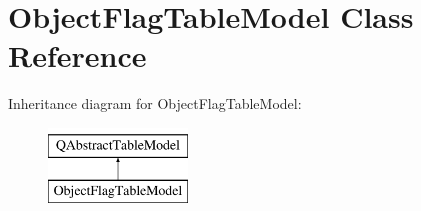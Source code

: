 \hypertarget{class_object_flag_table_model}{}\section{Object\+Flag\+Table\+Model Class Reference}
\label{class_object_flag_table_model}
Inheritance diagram for Object\+Flag\+Table\+Model\+:\begin{figure}[H]
\begin{center}
\leavevmode
\includegraphics[height=2.000000cm]{class_object_flag_table_model}
\end{center}
\end{figure}
